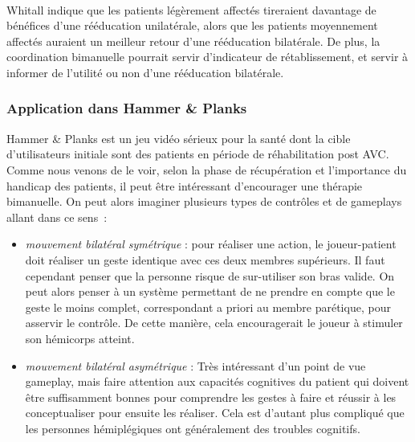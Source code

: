 \paragraph{}
Whitall \cite{Whit04} indique que les patients légèrement affectés tireraient davantage de bénéfices d'une rééducation unilatérale, alors que les patients moyennement affectés auraient un meilleur retour d'une rééducation bilatérale. De plus, la coordination bimanuelle pourrait servir d'indicateur de rétablissement, et servir à informer de l'utilité ou non d'une rééducation bilatérale.

		\subsubsection*{Application dans Hammer \& Planks}
Hammer \& Planks est un jeu vidéo sérieux pour la santé dont la cible d'utilisateurs initiale sont des patients en période de réhabilitation post AVC. Comme nous venons de le voir, selon la phase de récupération et l'importance du handicap des patients, il peut être intéressant d'encourager une thérapie bimanuelle. On peut alors imaginer plusieurs types de contrôles et de gameplays allant dans ce sens~:
\begin{itemize}
	\item \emph{mouvement bilatéral symétrique} : pour réaliser une action, le joueur-patient doit réaliser un geste identique avec ces deux membres supérieurs. Il faut cependant penser que la personne risque de sur-utiliser son bras valide. On peut alors penser à un système permettant de ne prendre en compte que le geste le moins complet, correspondant a priori au membre parétique, pour asservir le contrôle. De cette manière, cela encouragerait le joueur à stimuler son hémicorps atteint.
	\item \emph{mouvement bilatéral asymétrique} : Très intéressant d'un point de vue gameplay, mais faire attention aux capacités cognitives du patient qui doivent être suffisamment bonnes pour comprendre les gestes à faire et réussir à les conceptualiser pour ensuite les réaliser. Cela est d'autant plus compliqué que les personnes hémiplégiques ont généralement des troubles cognitifs.
\end{itemize}